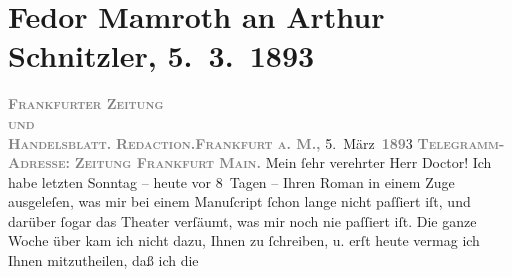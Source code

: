 

         
         \renewcommand{\erwaehntePersonen}{Personen: Leo N. von Tolstoi}
         \renewcommand{\erwaehnteInstitutionen}{Institutionen: Frankfurter Zeitung}
         \renewcommand{\erwaehnteOrte}{Orte: Deutschland, Frankfurt am Main, Wien, Österreich}
         \renewcommand{\erwaehnteWerke}{Werke: Krieg und Frieden, Sterben. Novelle}
               \section[Fedor Mamroth an Arthur Schnitzler, 5. 3. 1893]{ Fedor Mamroth an Arthur Schnitzler, 5. 3. 1893}\nopagebreak{}\rehead{ }\begin{ledgroupsized}[t]{13cm}\normalsize\beginnumbering \toendnotes[C]{\smallbreak\pagebreak[2]} 
\toendnotes[C]{\smallbreak}\pstart
           \noindent{}{\pb}\textcolor{gray}{\textbf{\textsc{Frankfurter Zeitung}}}{\\}\textsc{\textcolor{gray}{\textbf{und}}}{\\}\textcolor{gray}{\textbf{\textsc{Handelsblatt.}}}\pend
           \pstart
           \textcolor{gray}{\textbf{\textsc{Redaction.}}}\hfill \textcolor{gray}{\textbf{\textsc{Frankfurt a. M.,}}}{ }5. März \textsc{\textcolor{gray}{\textbf{189}}}3\pend
           \pstart
           \textcolor{gray}{\textbf{\textsc{Telegramm-Adresse:}}}\pend
           \pstart
           \textcolor{gray}{\textbf{\textsc{Zeitung Frankfurt Main.}}}\pend
           \pstart{}Mein ſehr verehrter Herr Doctor!\pend\pstart
           Ich habe letzten Sonntag – heute vor 8 Tagen – Ihren Roman in einem Zuge ausgeleſen, was mir bei
               einem Manuſcript ſchon lange nicht paſſiert iſt, und darüber ſogar das Theater
               verſäumt, was mir noch nie paſſiert iſt. Die ganze Woche über kam ich nicht dazu,
               Ihnen zu ſchreiben, u. erſt heute vermag ich Ihnen mitzutheilen, daß ich die

\end{ledgroupsized}
